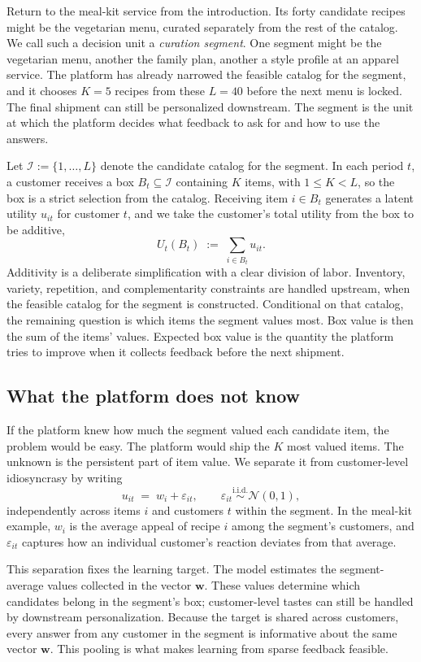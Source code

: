 \documentclass[11pt]{article}
\theoremstyle{definition}
\theoremstyle{remark}
\newcommand{\1}{\mathbf{1}}
\begin{document}
Return to the meal-kit service from the introduction. Its forty
candidate recipes might be the vegetarian menu, curated separately from
the rest of the catalog. We call such a decision unit a \emph{curation
segment}. One segment might be the vegetarian menu, another the family
plan, another a style profile at an apparel service. The platform has
already narrowed the feasible catalog for the segment, and it chooses
\(K=5\) recipes from these \(L=40\) before the next menu is locked. The
final shipment can still be personalized downstream. The segment is the
unit at which the platform decides what feedback to ask for and how to
use the answers.

Let $\mathcal I := \{1,\dots,L\}$ denote the candidate catalog for the
segment. In each period $t$, a customer receives a box
$B_t \subseteq \mathcal I$ containing $K$ items, with \(1\le K<L\), so
the box is a strict selection from the catalog. Receiving item
$i \in B_t$ generates a latent utility $u_{it}$ for customer $t$, and
we take the customer's total utility from the box to be additive,
\[
U_t(B_t) \;:=\; \sum_{i \in B_t} u_{it}.
\]
Additivity is a deliberate simplification with a clear division of
labor. Inventory, variety, repetition, and complementarity constraints
are handled upstream, when the feasible catalog for the segment is
constructed. Conditional on that catalog, the remaining question is
which items the segment values most. Box value is then the sum of the
items' values. Expected box value is the quantity the platform tries to
improve when it collects feedback before the next shipment.

\subsection{What the platform does not know}\label{subsec:unknown}

If the platform knew how much the segment valued each candidate item,
the problem would be easy. The platform would ship the \(K\) most valued
items. The unknown
is the persistent part of item value. We separate it from
customer-level idiosyncrasy by writing
\[
u_{it} \;=\; w_i + \varepsilon_{it},
\qquad \varepsilon_{it} \overset{\text{i.i.d.}}{\sim} \mathcal N(0,1),
\]
independently across items $i$ and customers $t$ within the segment.
In the meal-kit example, $w_i$ is the average appeal of recipe $i$
among the segment's customers, and \(\varepsilon_{it}\) captures how an
individual customer's reaction deviates from that average.

This separation fixes the learning target. The model estimates the
segment-average values collected in the vector \(\mathbf w\). These
values determine which candidates belong in the segment's box;
customer-level tastes can still be handled by downstream
personalization. Because the target is shared across
customers, every answer from any customer in the segment is informative
about the same vector \(\mathbf w\). This pooling is what makes
learning from sparse feedback feasible.
\end{document}
